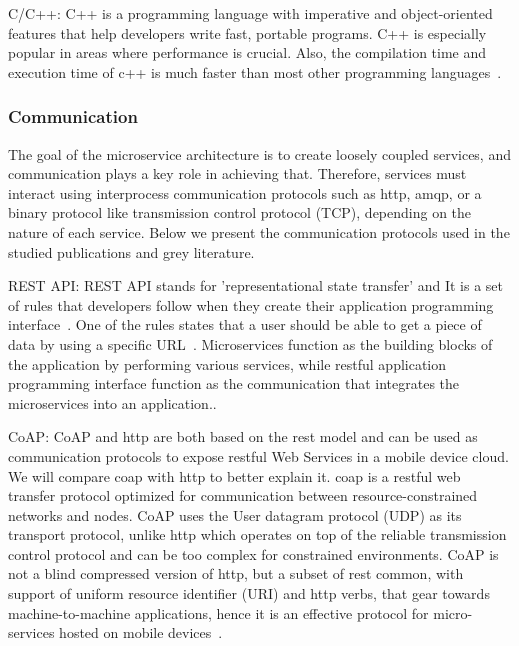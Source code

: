 \par C/C++: C++ is a programming language with imperative and object-oriented features that help developers write fast, portable programs. C++ is especially popular in areas where performance is crucial. Also, the compilation time and execution time of c++ is much faster than most other programming languages~\cite{Ghebremicael2017}. 


\subsubsection{Communication}

The goal of the microservice architecture is to create loosely coupled services, and communication plays a key role in achieving that. Therefore, services must interact using interprocess communication protocols such as http, amqp, or a binary protocol like transmission control protocol (TCP), depending on the nature of each service. Below we present the communication protocols used in the studied publications and grey literature.

\par REST API: REST API stands for 'representational state transfer' and It is a set of rules that developers follow when they create their application programming interface~\cite{Ndungu2019, Zhang2019}. One of the rules states that a user should be able to get a piece of data by using a specific URL~\cite{Koschel2017, Branko2018}. Microservices function as the building blocks of the application by performing various services, while restful application programming interface function as the communication that integrates the microservices into an application.\cite{liu2018, Zaytev2018, chauvel2018, Johansson2019}.

\par CoAP: CoAP and http are both based on the rest model and can be used as communication protocols to expose restful Web Services in a mobile device cloud. We will compare coap with http to better explain it. coap is a restful web transfer protocol optimized for communication between resource-constrained networks and nodes. CoAP uses the User datagram protocol (UDP) as its transport protocol, unlike http which operates on top of the reliable transmission control protocol and can be too complex for constrained environments. CoAP is not a blind compressed version of http, but a subset of rest common, with support of uniform resource identifier (URI) and http verbs, that gear towards machine-to-machine applications, hence it is an effective protocol for micro-services hosted on mobile devices~\cite{liu2018, khan2017}.

